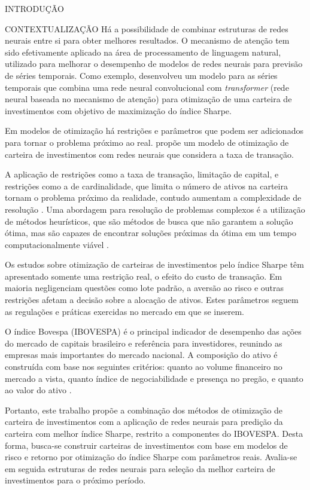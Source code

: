 \begin{section}{INTRODUÇÃO}
\begin{subsection}{CONTEXTUALIZAÇÃO}
        \ipar Há a possibilidade de combinar estruturas de redes neurais entre si para obter melhores resultados. O mecanismo de atenção tem sido efetivamente aplicado na área de processamento de linguagem natural, utilizado para melhorar o desempenho de modelos de redes neurais para previsão de séries temporais. Como exemplo,  desenvolveu um modelo para as séries temporais que combina uma rede neural convolucional com \textit{transformer} (rede neural baseada no mecanismo de atenção) para otimização de uma carteira de investimentos com objetivo de maximização do índice Sharpe.

        \ipar Em modelos de otimização há restrições e parâmetros que podem ser adicionados para tornar o problema próximo ao real.  propõe um modelo de otimização de carteira de investimentos com redes neurais que considera a taxa de transação. 
        
        \ipar A aplicação de restrições como a taxa de transação, limitação de capital, e restrições como a de cardinalidade, que limita o número de ativos na carteira tornam o problema próximo da realidade, contudo aumentam a complexidade de resolução \cite{aithal2023real}. Uma abordagem para resolução de problemas complexos é a utilização de métodos heurísticos, que são métodos de busca que não garantem a solução ótima, mas são capazes de encontrar soluções próximas da ótima em um tempo computacionalmente viável \cite{milhomem2020analysis}.

        \ipar Os estudos sobre otimização de carteiras de investimentos pelo índice Sharpe têm apresentado somente uma restrição real, o efeito do custo de transação. Em maioria negligenciam questões como lote padrão, a aversão ao risco e outras restrições afetam a decisão sobre a alocação de ativos. Estes parâmetros seguem as regulações e práticas exercidas no mercado em que se inserem.

        \ipar O índice Bovespa (\acrshort{IBOVESPA}) é o principal indicador de desempenho das ações do mercado de capitais brasileiro e referência para investidores, reunindo as empresas mais importantes do mercado nacional. A composição do ativo é construída com base nos seguintes critérios: quanto ao volume financeiro no mercado a vista, quanto índice de negociabilidade e presença no pregão, e quanto ao valor do ativo \cite{B32023}. 

        \ipar Portanto, este trabalho propõe a combinação dos métodos de otimização de carteira de investimentos com a aplicação de redes neurais para predição da carteira com melhor índice Sharpe, restrito a componentes do \acrshort{IBOVESPA}. Desta forma, busca-se construir carteiras de investimentos com base em modelos de risco e retorno por otimização do índice Sharpe com parâmetros reais. Avalia-se em seguida estruturas de redes neurais para seleção da melhor carteira de investimentos  para o próximo período.


\end{subsection}
\end{section}
